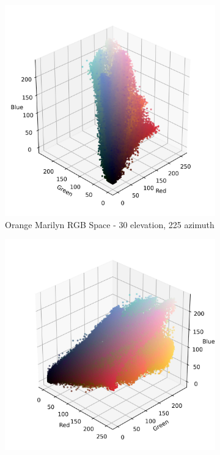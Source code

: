 \documentclass{article}
\begin{document}
\begin{figure}[ht]\ContinuedFloat
  \centering
  \begin{subfigure}{0.45\textwidth}
    \includegraphics[width=\textwidth]{main_files/figure-latex/4_3_orange_marilyn_original_scatter.jpg}
    \caption{Orange Marilyn RGB Space - 30 \degree elevation, 225 \degree azimuth}
    \label{fig:4_3_orange_marilyn_original_scatter}
  \end{subfigure}
  \hfill
  \begin{subfigure}{0.45\textwidth}
    \includegraphics[width=\textwidth]{main_files/figure-latex/4_4_orange_marilyn_original_scatter.jpg}

\end{subfigure}
\end{figure}
\end{document}
